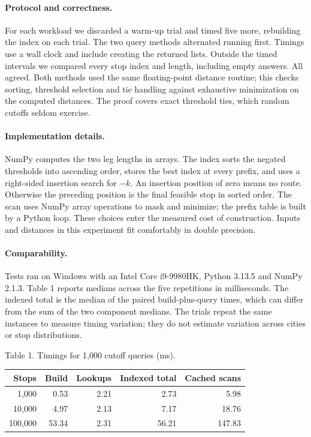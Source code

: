 \documentclass[11pt]{article}
\begin{document}
\paragraph{Protocol and correctness.}
For each workload we discarded a warm-up trial and timed five more,
rebuilding the index on each trial. The two query methods alternated running
first. Timings use a wall clock and include creating the returned lists.
Outside the timed intervals we compared every stop index and length,
including empty answers. All agreed. Both methods used the same floating-point
distance routine; this checks sorting, threshold selection and tie handling
against exhaustive minimization on the computed distances. The proof covers
exact threshold ties, which random cutoffs seldom exercise.

\paragraph{Implementation details.}
NumPy computes the two leg lengths in arrays. The index sorts the negated
thresholds into ascending order, stores the best index at every prefix, and
uses a right-sided insertion search for $-k$. An insertion position of zero
means no route. Otherwise the preceding position is the final feasible stop
in sorted order. The scan uses NumPy array operations to mask and minimize;
the prefix table is built by a Python loop. These choices enter the measured
cost of construction. Inputs and distances in this experiment fit comfortably
in double precision.

\paragraph{Comparability.}
Tests ran on Windows with an Intel Core i9-9980HK, Python 3.13.5 and
NumPy 2.1.3. Table 1 reports medians across the five repetitions in
milliseconds. The indexed total is the median of the paired build-plus-query
times, which can differ from the sum of the two component medians.
The trials repeat the same instances to measure timing variation; they do
not estimate variation across cities or stop distributions.

\begin{center}
\small Table 1. Timings for 1,000 cutoff queries (ms).\par\smallskip
\begin{tabular}{rrrrr}
\toprule
Stops & Build & Lookups & Indexed total & Cached scans\\
\midrule
1,000 & 0.53 & 2.21 & 2.73 & 5.98\\
10,000 & 4.97 & 2.13 & 7.17 & 18.76\\
100,000 & 53.34 & 2.31 & 56.21 & 147.83\\
\bottomrule
\end{tabular}
\end{center}
\end{document}
